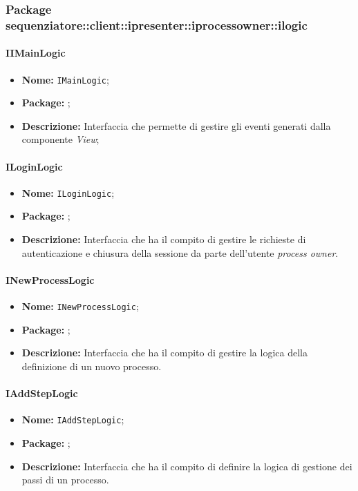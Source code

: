 \subsubsection{Package sequenziatore::client::ipresenter::iprocessowner::ilogic}
\paragraph{IIMainLogic}
\begin{itemize}
\item \textbf{Nome:} \texttt{IMainLogic};
\item \textbf{Package:} \texttt{\iLogicAdmin{}};
\item \textbf{Descrizione:} Interfaccia che permette di gestire gli eventi generati dalla componente \textit{View};
\end{itemize}

\paragraph{ILoginLogic}
\begin{itemize}
\item \textbf{Nome:} \texttt{ILoginLogic};
\item \textbf{Package:} \texttt{\iLogicAdmin{}};
\item \textbf{Descrizione:} Interfaccia che ha il compito di gestire le richieste di autenticazione e chiusura della sessione da parte dell'utente \textit{process owner}.
\end{itemize}

\paragraph{INewProcessLogic}
\begin{itemize}
\item \textbf{Nome:} \texttt{INewProcessLogic};
\item \textbf{Package:} \texttt{\iLogicAdmin{}};
\item \textbf{Descrizione:} Interfaccia che ha il compito di gestire la logica della definizione di un nuovo processo.
\end{itemize}


\paragraph{IAddStepLogic}
\begin{itemize}
\item \textbf{Nome:} \texttt{IAddStepLogic};
\item \textbf{Package:} \texttt{\iLogicAdmin{}};
\item \textbf{Descrizione:} Interfaccia che ha il compito di definire la logica di gestione dei passi di un processo.
\end{itemize}


